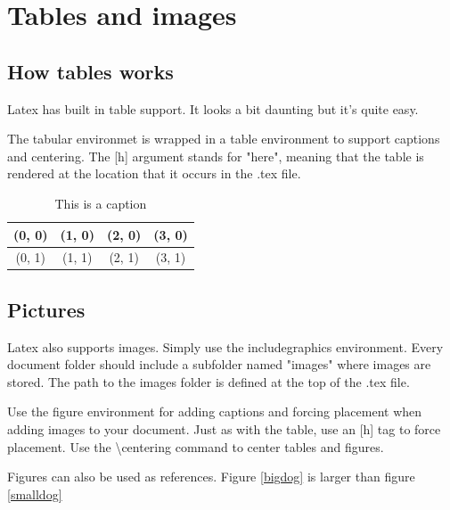 \documentclass{article}
\begin{document}
\section{Tables and images}
    \subsection{How tables works}
        Latex has built in table support. It looks a bit daunting but it's quite easy.
        
        The tabular environmet is wrapped in a table environment to support captions and centering. The [h] argument stands for "here", meaning that the table is rendered at the location that it occurs in the .tex file. 
        \begin{table}[h] %
            \centering
            \begin{tabular}{|c|c|c|c|} %
            \hline %
                 (0, 0) & (1, 0) & (2, 0) & (3, 0) \\ %
            \hline            
                 (0, 1) & (1, 1) & (2, 1) & (3, 1) \\ %
            \hline
            \end{tabular} %
            \caption{This is a caption} %
        \end{table}
        
        \subsection{Pictures}
        Latex also supports images. Simply use the includegraphics environment. Every document folder should include a subfolder named "images" where images are stored. The path to the images folder is defined at the top of the .tex file. 
        
        Use the figure environment for adding captions and forcing placement when adding images to your document. Just as with the table, use an [h] tag to force placement. Use the \textbackslash centering command to center tables and figures. 
        
        Figures can also be used as references. Figure \ref{bigdog} is larger than figure \ref{smalldog}
        
\end{document}
